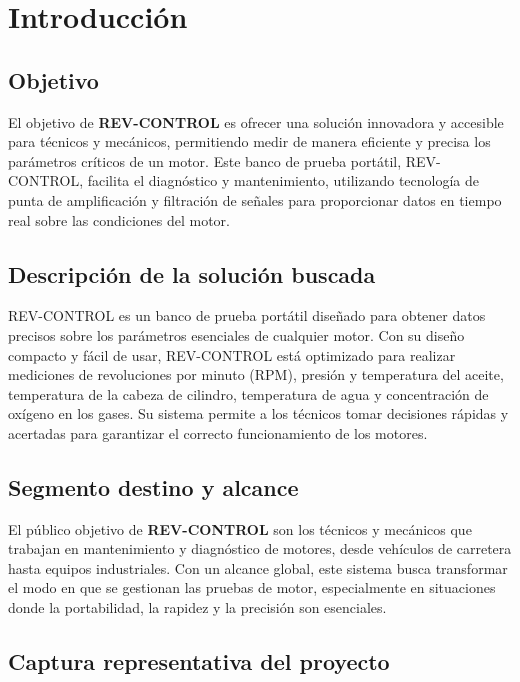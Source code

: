 \chapter{Introducción}

\section{Objetivo}  
El objetivo de \textbf{REV-CONTROL} es ofrecer una solución innovadora y accesible para técnicos y mecánicos, permitiendo medir de manera eficiente y precisa los parámetros críticos de un motor. Este banco de prueba portátil, REV-CONTROL, facilita el diagnóstico y mantenimiento, utilizando tecnología de punta de amplificación y filtración de señales para proporcionar datos en tiempo real sobre las condiciones del motor.

\section{Descripción de la solución buscada}  
REV-CONTROL es un banco de prueba portátil diseñado para obtener datos precisos sobre los parámetros esenciales de cualquier motor. Con su diseño compacto y fácil de usar, REV-CONTROL está optimizado para realizar mediciones de revoluciones por minuto (RPM), presión y temperatura del aceite, temperatura de la cabeza de cilindro, temperatura de agua y concentración de oxígeno en los gases. Su sistema permite a los técnicos tomar decisiones rápidas y acertadas para garantizar el correcto funcionamiento de los motores.

\section{Segmento destino y alcance}  
El público objetivo de \textbf{REV-CONTROL} son los técnicos y mecánicos que trabajan en mantenimiento y diagnóstico de motores, desde vehículos de carretera hasta equipos industriales. Con un alcance global, este sistema busca transformar el modo en que se gestionan las pruebas de motor, especialmente en situaciones donde la portabilidad, la rapidez y la precisión son esenciales.

\section{Captura representativa del proyecto}

